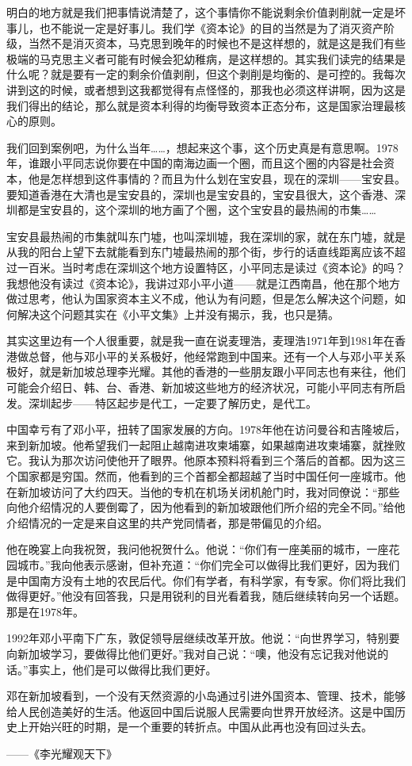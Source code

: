 \documentclass[UTF8, 12pt, a4paper]{ctexrep}
\begin{document}
明白的地方就是我们把事情说清楚了，这个事情你不能说剩余价值剥削就一定是坏事儿，也不能说一定是好事儿。我们学《资本论》的目的当然是为了消灭资产阶级，当然不是消灭资本，马克思到晚年的时候也不是这样想的，就是这是我们有些极端的马克思主义者可能有时候会犯幼稚病，是这样想的。其实我们读完的结果是什么呢？就是要有一定的剩余价值剥削，但这个剥削是均衡的、是可控的。我每次讲到这的时候，或者想到这我都觉得有点怪怪的，那我也必须这样讲啊，因为这是我们得出的结论，那么就是资本利得的均衡导致资本正态分布，这是国家治理最核心的原则。

我们回到案例吧，为什么当年……，想起来这个事，这个历史真是有意思啊。1978年，谁跟小平同志说你要在中国的南海边画一个圈，而且这个圈的内容是社会资本，他是怎样想到这件事情的？而且为什么划在宝安县，现在的深圳——宝安县。要知道香港在大清也是宝安县的，深圳也是宝安县的，宝安县很大，这个香港、深圳都是宝安县的，这个深圳的地方画了个圈，这个宝安县的最热闹的市集……

宝安县最热闹的市集就叫东门墟，也叫深圳墟，我在深圳的家，就在东门墟，就是从我的阳台上望下去就能看到东门墟最热闹的那个街，步行的话直线距离应该不超过一百米。当时考虑在深圳这个地方设置特区，小平同志是读过《资本论》的吗？我想他没有读过《资本论》，我讲过邓小平小道——就是江西南昌，他在那个地方做过思考，他认为国家资本主义不成，他认为有问题，但是怎么解决这个问题，如何解决这个问题其实在《小平文集》上并没有揭示，我，也只是猜。

其实这里边有一个人很重要，就是我一直在说麦理浩，麦理浩1971年到1981年在香港做总督，他与邓小平的关系极好，他经常跑到中国来。还有一个人与邓小平关系极好，就是新加坡总理李光耀。其他的香港的一些朋友跟小平同志也有来往，他们可能会介绍日、韩、台、香港、新加坡这些地方的经济状况，可能小平同志有所启发。深圳起步——特区起步是代工，一定要了解历史，是代工。

{\kaishu 中国幸亏有了邓小平，扭转了国家发展的方向。1978年他在访问曼谷和吉隆坡后，来到新加坡。他希望我们一起阻止越南进攻柬埔寨，如果越南进攻柬埔寨，就挫败它。我认为那次访问使他开了眼界。他原本预料将看到三个落后的首都。因为这三个国家都是穷国。然而，他看到的三个首都全都超越了当时中国任何一座城市。他在新加坡访问了大约四天。当他的专机在机场关闭机舱门时，我对同僚说：“那些向他介绍情况的人要倒霉了，因为他看到的新加坡跟他们所介绍的完全不同。”给他介绍情况的一定是来自这里的共产党同情者，那是带偏见的介绍。

他在晚宴上向我祝贺，我问他祝贺什么。他说：“你们有一座美丽的城市，一座花园城市。”我向他表示感谢，但补充道：“你们完全可以做得比我们更好，因为我们是中国南方没有土地的农民后代。你们有学者，有科学家，有专家。你们将比我们做得更好。”他没有回答我，只是用锐利的目光看着我，随后继续转向另一个话题。那是在1978年。

1992年邓小平南下广东，敦促领导层继续改革开放。他说：“向世界学习，特别要向新加坡学习，要做得比他们更好。”我对自己说：“噢，他没有忘记我对他说的话。”事实上，他们是可以做得比我们更好。

邓在新加坡看到，一个没有天然资源的小岛通过引进外国资本、管理、技术，能够给人民创造美好的生活。他返回中国后说服人民需要向世界开放经济。这是中国历史上开始兴旺的时期，是一个重要的转折点。中国从此再也没有回过头去。

——《李光耀观天下》}
\end{document}
